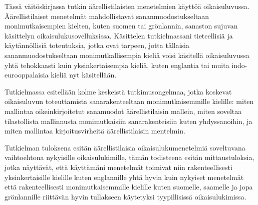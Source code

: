 Tässä väitöskirjassa tutkin äärellistilaisten menetelmien käyttöä
oikaisuluvussa. Äärellistilaiset menetelmät mahdollistavat sananmuodostukseltaan
monimutkaisempien kielten, kuten suomen tai grönlannin, sanaston sujuvan
käsittelyn oikaisulukusovelluksissa. Käsittelen tutkielmassani tieteellisiä
ja käytännöllisiä toteutuksia, jotka ovat tarpeen, jotta tällaisia
sananmuodostukseltaan monimutkallisempia kieliä voisi käsitellä oikaisuluvussa
yhtä tehokkaasti kuin yksinkertaisempia kieliä, kuten englantia tai
muita indo-eurooppalaisia kieliä nyt käsitellään.

Tutkielmassa esitellään kolme keskeistä tutkimusongelmaa, jotka koskevat
oikaisuluvun toteuttamista sanarakenteeltaan monimutkaisemmille kielille:
miten mallintaa oikeinkirjoitetut sanamuodot äärellistilaisin mallein,
miten soveltaa tilastollista mallinnusta monimutkaisiin sanarakenteisiin kuten
yhdyssanoihin, ja miten mallintaa kirjoitusvirheitä äärellistilaisin mentelmin.

Tutkielman tuloksena esitän äärellistilaisia oikaisulukumenetelmiä soveltuvana
vaihtoehtona nykyisille oikaisulukimille, tämän todisteena esitän
mittaustuloksia, jotka näyttävät, että käyttämäni menetelmät toimivat niin
rakenteellisesti yksinkertaisille kielille kuten englannille yhtä hyvin kuin
nykyiset menetelmät että rakenteellisesti monimutkaisemmille kielille kuten
suomelle, saamelle ja jopa grönlannille riittävän hyvin tullakseen käytetyksi
tyypillisissä oikaisulukimissa.

